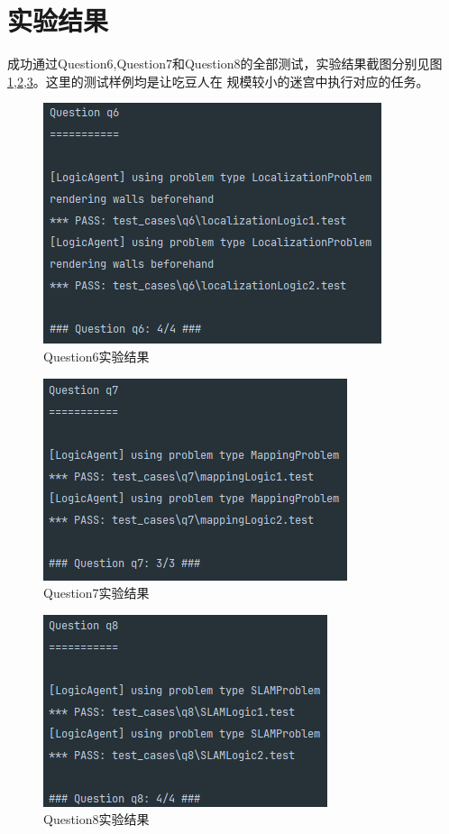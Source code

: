 \section{实验结果}
成功通过Question6,Question7和Question8的全部测试，实验结果截图分别见图\ref{q6},\ref{q7},\ref{q8}。这里的测试样例均是让吃豆人在
规模较小的迷宫中执行对应的任务。
\begin{figure}[htbp]
    \centering
    \includegraphics{pic/q6.png}
    \caption{Question6实验结果}\label{q6}
\end{figure}
\begin{figure}[htbp]
    \centering
    \includegraphics{pic/q7.png}
    \caption{Question7实验结果}\label{q7}
\end{figure}
\begin{figure}[htbp]
    \centering
    \includegraphics{pic/q8.png}
    \caption{Question8实验结果}\label{q8}
\end{figure}
%
%
%
